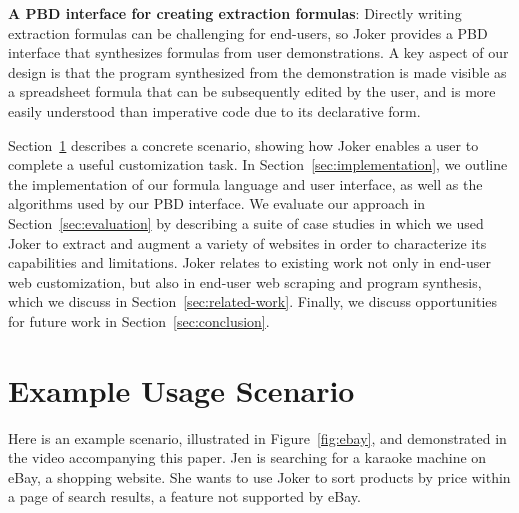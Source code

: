 \documentclass[sigconf,10pt]{acmart}
\begin{document}
\textbf{A PBD interface for creating extraction formulas}: Directly
writing extraction formulas can be challenging for end-users, so Joker
provides a PBD interface that synthesizes formulas from user
demonstrations. A key aspect of our design is that the program
synthesized from the demonstration is made visible as a spreadsheet
formula that can be subsequently edited by the user, and is more easily
understood than imperative code due to its declarative form.

Section~\ref{sec:examples} describes a concrete scenario, showing how
Joker enables a user to complete a useful customization task. In
Section~\ref{sec:implementation}, we outline the implementation of our
formula language and user interface, as well as the algorithms used by
our PBD interface. We evaluate our approach in
Section~\ref{sec:evaluation} by describing a suite of case studies in
which we used Joker to extract and augment a variety of websites in
order to characterize its capabilities and limitations. Joker relates to
existing work not only in end-user web customization, but also in
end-user web scraping and program synthesis, which we discuss in
Section~\ref{sec:related-work}. Finally, we discuss opportunities for
future work in Section~\ref{sec:conclusion}.

\hypertarget{sec:examples}{%
\section{Example Usage Scenario}\label{sec:examples}}

Here is an example scenario, illustrated in Figure~\ref{fig:ebay}, and
demonstrated in the video accompanying this paper. Jen is searching for
a karaoke machine on eBay, a shopping website. She wants to use Joker to
sort products by price within a page of search results, a feature not
supported by eBay.
\end{document}
